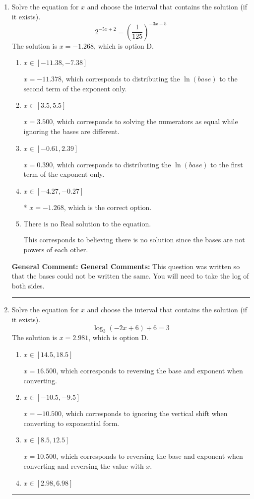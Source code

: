 \documentclass{extbook}[14pt]
\newcommand{\litem}[1]{\item #1

\rule{\textwidth}{0.4pt}}
\begin{document}
\begin{enumerate}\litem{
Solve the equation for $x$ and choose the interval that contains the solution (if it exists).
\[ 2^{-5x+2} = \left(\frac{1}{125}\right)^{-3x-5} \]
The solution is \( x = -1.268 \), which is option D.\begin{enumerate}[label=\Alph*.]
\item \( x \in [-11.38, -7.38] \)

$x = -11.378$, which corresponds to distributing the $\ln(base)$ to the second term of the exponent only.
\item \( x \in [3.5, 5.5] \)

$x = 3.500$, which corresponds to solving the numerators as equal while ignoring the bases are different.
\item \( x \in [-0.61, 2.39] \)

$x = 0.390$, which corresponds to distributing the $\ln(base)$ to the first term of the exponent only.
\item \( x \in [-4.27, -0.27] \)

* $x = -1.268$, which is the correct option.
\item \( \text{There is no Real solution to the equation.} \)

This corresponds to believing there is no solution since the bases are not powers of each other.
\end{enumerate}

\textbf{General Comment:} \textbf{General Comments:} This question was written so that the bases could not be written the same. You will need to take the log of both sides.
}
\litem{
Solve the equation for $x$ and choose the interval that contains the solution (if it exists).
\[ \log_{3}{(-2x+6)}+6 = 3 \]
The solution is \( x = 2.981 \), which is option D.\begin{enumerate}[label=\Alph*.]
\item \( x \in [14.5, 18.5] \)

$x = 16.500$, which corresponds to reversing the base and exponent when converting.
\item \( x \in [-10.5, -9.5] \)

$x = -10.500$, which corresponds to ignoring the vertical shift when converting to exponential form.
\item \( x \in [8.5, 12.5] \)

$x = 10.500$, which corresponds to reversing the base and exponent when converting and reversing the value with $x$.
\item \( x \in [2.98, 6.98] \)


\end{enumerate}}
\end{enumerate}
\end{document}
